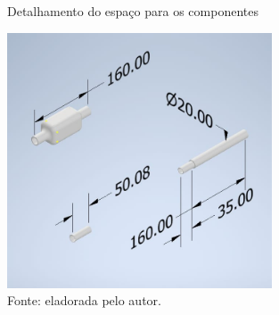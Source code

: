         \begin{figure}[h!]
        \captionsetup{width=1\textwidth}
        \caption{\label{fig:prototipo3}Detalhamento do espaço para os componentes}
        \centering
        \includegraphics[width=0.7\textwidth]{figuras/prototipo3.jpeg} 
        \caption*{Fonte: eladorada pelo autor.}
    \end{figure}